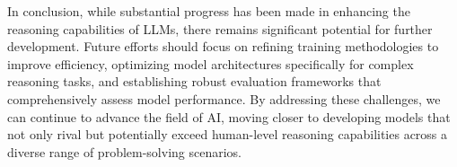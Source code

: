 \documentclass[conference]{IEEEtran}
\begin{document}
In conclusion, while substantial progress has been made in enhancing the reasoning capabilities of LLMs, there remains significant potential for further development. Future efforts should focus on refining training methodologies to improve efficiency, optimizing model architectures specifically for complex reasoning tasks, and establishing robust evaluation frameworks that comprehensively assess model performance. By addressing these challenges, we can continue to advance the field of AI, moving closer to developing models that not only rival but potentially exceed human-level reasoning capabilities across a diverse range of problem-solving scenarios.





\end{document}
